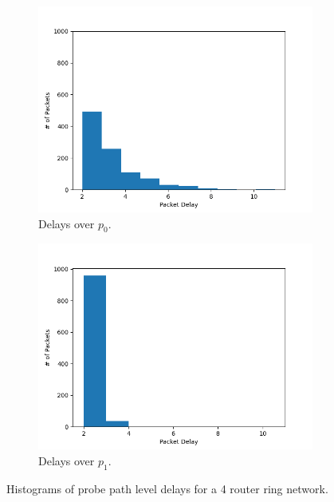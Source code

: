 \begin{figure}[H]
    \begin{subfigure}[b]{0.475\textwidth}
        \includegraphics[width=\textwidth]{figs/intro/p0_delayhist.png}
        \caption[]{Delays over $p_0$.}
    \end{subfigure}
    \begin{subfigure}[b]{0.475\textwidth}
        \includegraphics[width=\textwidth]{figs/intro/p1_delayhist.png}
        \caption[]{Delays over $p_1$.}
    \end{subfigure}
    \caption{Histograms of probe path level delays for a 4 router ring network.}
    \label{fig:ppdelayhist}
\end{figure}
